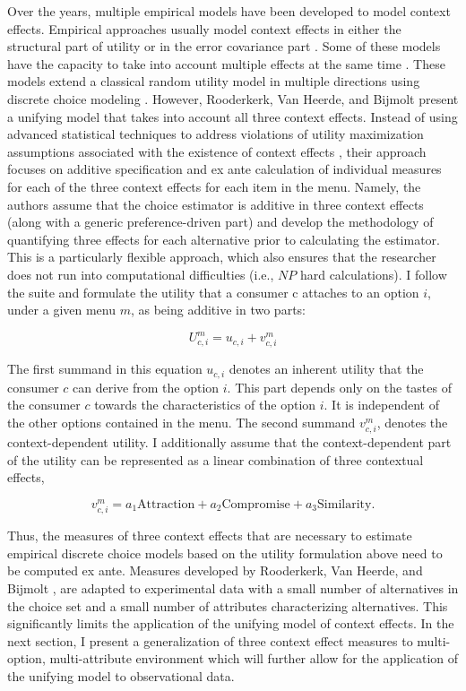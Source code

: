 \documentclass[a4paper,12pt]{article}
\newcommand{\citeyearonly}[1]{\citeyearpar{#1}}
\begin{document}
Over the years, multiple empirical models have been developed to model context effects. Empirical approaches usually model context effects in either the structural part of utility or in the error covariance part \citep{kamakuraSrivastava84, dotsonEtAl18}. Some of these models have the capacity to take into account multiple effects at the same time \citep{tverskySimonson93, orhun09}. These models extend a classical random utility model \citep{mcfadden01} in multiple directions using discrete choice modeling \citep{benAkivaLerman85}. However, Rooderkerk, Van Heerde, and Bijmolt \citeyearonly{roodrkerkEtAl11} present a unifying model that takes into account all three context effects. Instead of using advanced statistical techniques to address violations of utility maximization assumptions associated with the existence of context effects \citep{luce59}, their approach focuses on additive specification and ex ante calculation of individual measures for each of the three context effects for each item in the menu. Namely, the authors assume that the choice estimator is additive in three context effects (along with a generic preference-driven part) and develop the methodology of quantifying three effects for each alternative prior to calculating the estimator. This is a particularly flexible approach, which also ensures that the researcher does not run into computational difficulties (i.e., $NP$ hard calculations). I follow the suite and formulate the utility that a consumer c attaches to an option $i$, under a given menu $m$, as being additive in two parts:

$$U_{c,i}^m = u_{c,i} + v_{c,i}^m$$

The first summand in this equation $u_{c,i}$ denotes an inherent utility that the consumer $c$ can derive from the option $i$. This part depends only on the tastes of the consumer $c$ towards the characteristics of the option $i$. It is independent of the other options contained in the menu. The second summand $v_{c,i}^m$, denotes the context-dependent utility. I additionally assume that the context-dependent part of the utility can be represented as a linear combination of three contextual effects, 

$$v_{c,i}^m = a_1 \text{Attraction} + a_2 \text{Compromise} + a_3 \text{Similarity}.
$$

Thus, the measures of three context effects that are necessary to estimate empirical discrete choice models based on the utility formulation above need to be computed ex ante. Measures developed by Rooderkerk, Van Heerde, and Bijmolt \citeyearonly{roodrkerkEtAl11}, are adapted to experimental data with a small number of alternatives in the choice set and a small number of attributes characterizing alternatives. This significantly limits the application of the unifying model of context effects. In the next section, I present a generalization of three context effect measures to multi-option, multi-attribute environment which will further allow for the application of the unifying model to observational data.
\end{document}
